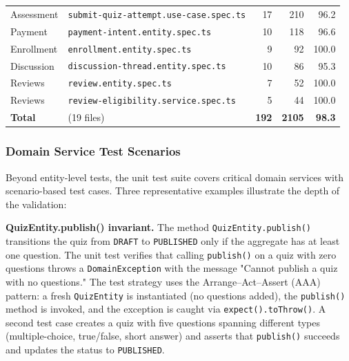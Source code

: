 \begin{table}[H]
\begin{tabular}{llrrr}
    \rowcolor{green!10}
    Assessment         & \texttt{submit-quiz-attempt.use-case.spec.ts}  & 17             & 210            & 96.2 \\
    \rowcolor{green!10}
    Payment            & \texttt{payment-intent.entity.spec.ts}         & 10             & 118            & 96.6 \\
    \rowcolor{green!10}
    Enrollment         & \texttt{enrollment.entity.spec.ts}             & 9              & 92             & 100.0 \\
    \rowcolor{green!10}
    Discussion         & \texttt{discussion-thread.entity.spec.ts}      & 10             & 86             & 95.3 \\
    \rowcolor{green!10}
    Reviews            & \texttt{review.entity.spec.ts}                 & 7              & 52             & 100.0 \\
    \rowcolor{green!10}
    Reviews            & \texttt{review-eligibility.service.spec.ts}    & 5              & 44             & 100.0 \\
    \midrule
    \textbf{Total}     & (19 files)                                     & \textbf{192}   & \textbf{2105}  & \textbf{98.3} \\
    \bottomrule
  \end{tabular}
\end{table}

\subsubsection{Domain Service Test Scenarios}

Beyond entity-level tests, the unit test suite covers critical domain services with scenario-based test cases. Three representative examples illustrate the depth of the validation:

\textbf{QuizEntity.publish() invariant.} The method \texttt{QuizEntity.publish()} transitions the quiz from \texttt{DRAFT} to \texttt{PUBLISHED} only if the aggregate has at least one question. The unit test verifies that calling \texttt{publish()} on a quiz with zero questions throws a \texttt{DomainException} with the message "Cannot publish a quiz with no questions." The test strategy uses the Arrange--Act--Assert (AAA) pattern: a fresh \texttt{QuizEntity} is instantiated (no questions added), the \texttt{publish()} method is invoked, and the exception is caught via \texttt{expect().toThrow()}. A second test case creates a quiz with five questions spanning different types (multiple-choice, true/false, short answer) and asserts that \texttt{publish()} succeeds and updates the status to \texttt{PUBLISHED}.

